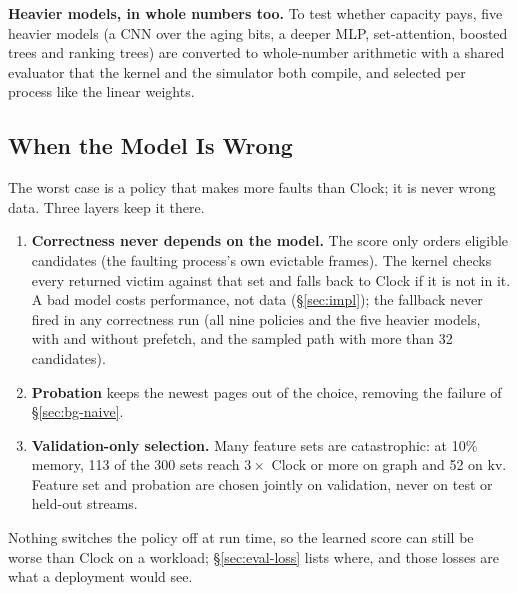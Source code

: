 \documentclass{article}
\newcommand{\clock}{Clock\xspace}
\newcommand{\finding}[1]{\textbf{#1}\hspace{0.4em}}
\begin{document}
\finding{Heavier models, in whole numbers too.} To test whether capacity pays, five
heavier models (a CNN over the aging bits, a deeper MLP, set-attention, boosted trees and
ranking trees) are converted to whole-number arithmetic with a shared evaluator that the
kernel and the simulator both compile, and selected per process like the linear weights.

\subsection{When the Model Is Wrong}
\label{sec:design-wrong}

The worst case is a policy that makes more faults than \clock; it is never wrong data.
Three layers keep it there.
\begin{enumerate}
\item \textbf{Correctness never depends on the model.} The score only orders eligible
  candidates (the faulting process's own evictable frames). The kernel checks every
  returned victim against that set and falls back to \clock if it is not in it. A bad
  model costs performance, not data (\S\ref{sec:impl}); the fallback never fired in any
  correctness run (all nine policies and the five heavier models, with and without
  prefetch, and the sampled path with more than 32 candidates).
\item \textbf{Probation} keeps the newest pages out of the choice, removing the failure
  of \S\ref{sec:bg-naive}.
\item \textbf{Validation-only selection.} Many feature sets are catastrophic: at 10\%
  memory, 113 of the 300 sets reach $3\times$ \clock or more on graph and 52 on kv.
  Feature set and probation are chosen jointly on validation, never on test or held-out
  streams.
\end{enumerate}
Nothing switches the policy off at run time, so the learned score can still be worse
than \clock on a workload; \S\ref{sec:eval-loss} lists where, and those losses are what a
deployment would see.
\end{document}
